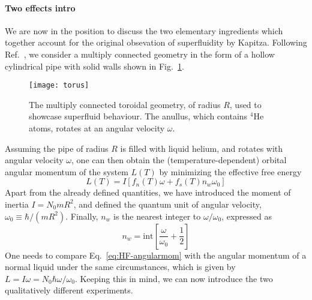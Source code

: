 \paragraph{Two effects intro}
We are now in the position to discuss the two elementary ingredients
which together account for the original obsevation of superfluidity by
Kapitza. Following Ref.~\cite{Leggett_1999}, we consider a multiply
connected geometry in the form of a hollow cylindrical pipe with solid
walls shown in Fig.~\ref{fig:torus}.
%
\begin{figure}[tb]\centering
  \texttt{[image: torus]}
  \caption{
    The multiply connected toroidal geometry, of radius $R$, used to
    showcase superfluid behaviour. The anullus, which contains ${}^4$He
    atoms, rotates at an angular velocity $\omega$.
  }\label{fig:torus}
\end{figure}
% 
Assuming the pipe of radius $R$ is filled with liquid helium, and
rotates with angular velocity $\omega$, one can then obtain the
(temperature-dependent) orbital angular momentum of the system $L(T)$
by minimizing the effective free energy~\cite{leggett2006quantum}
%
\begin{equation}\label{eq:HF-angularmom}
  L(T) = I\left[f_n(T)\omega + f_s(T)n_w\omega_0\right]
\end{equation}
% 
Apart from the already defined quantities, we have introduced the
moment of inertia $I = N_0mR^2$, and defined the quantum unit of
angular velocity, $\omega_0 \equiv \hbar/(mR^2)$. Finally, $n_w$ is the
nearest integer to $\omega/\omega_0$, expressed as
%
\begin{equation}\label{eq:nearest-integer}
  n_w = \text{int} \left[\frac{\omega}{\omega_0} + \frac{1}{2}\right]
\end{equation}
% 
One needs to compare Eq.~\eqref{eq:HF-angularmom} with the angular
momentum of a normal liquid under the same circumstances, which is
given by $L = I \omega = N_0 \hbar \omega/\omega_0$. Keeping this in
mind, we can now introduce the two qualitatively different
experiments.


